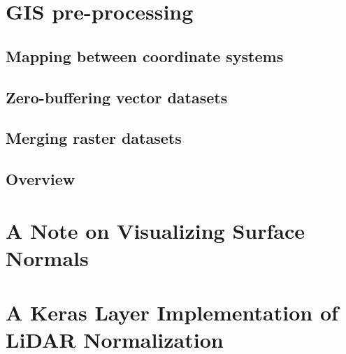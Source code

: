 \appendix
\chapter{GIS pre-processing}

\section{Mapping between coordinate systems}%
\label{app:srid-change}


\section{Zero-buffering vector datasets}%
\label{app:zero-buffer}


\section{Merging raster datasets}%
\label{app:raster-merging}


\clearpage
\section{Overview}%
\label{app:preprocessing-overview}%


\chapter{A Note on Visualizing Surface Normals}%
\label{app:normal-visualization}


\chapter{A Keras Layer Implementation of LiDAR Normalization}%
\label{app:lidar-normalization}

